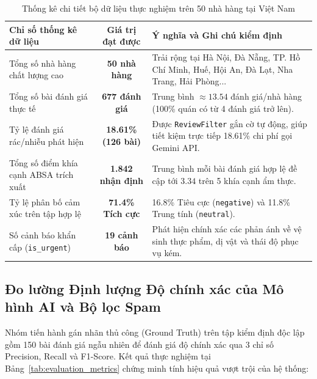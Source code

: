 \documentclass[12pt, a4paper]{article}
\begin{document}
\begin{table}[H]
\centering
\caption{Thống kê chi tiết bộ dữ liệu thực nghiệm trên 50 nhà hàng tại Việt Nam}
\label{tab:dataset_stats}
\vspace{0.15cm}
\footnotesize
\begin{tabularx}{\textwidth}{l c X}
\toprule
\rowcolor{blue!8}
\textbf{Chỉ số thống kê dữ liệu} & \textbf{Giá trị đạt được} & \textbf{Ý nghĩa và Ghi chú kiểm định} \\
\midrule
Tổng số nhà hàng chất lượng cao & \textbf{50 nhà hàng} & Trải rộng tại Hà Nội, Đà Nẵng, TP. Hồ Chí Minh, Huế, Hội An, Đà Lạt, Nha Trang, Hải Phòng... \\
\addlinespace
Tổng số bài đánh giá thực tế & \textbf{677 đánh giá} & Trung bình $\approx 13.54$ đánh giá/nhà hàng (100\% quán có từ 4 đánh giá trở lên). \\
\addlinespace
Tỷ lệ đánh giá rác/nhiễu phát hiện & \textbf{18.61\% (126 bài)} & Được \texttt{ReviewFilter} gắn cờ tự động, giúp tiết kiệm trực tiếp 18.61\% chi phí gọi Gemini API. \\
\addlinespace
Tổng số điểm khía cạnh ABSA trích xuất & \textbf{1.842 nhận định} & Trung bình mỗi bài đánh giá hợp lệ đề cập tới $3.34$ trên 5 khía cạnh ẩm thực. \\
\addlinespace
Tỷ lệ phân bố cảm xúc trên tập hợp lệ & \textbf{71.4\% Tích cực} & 16.8\% Tiêu cực (\texttt{negative}) và 11.8\% Trung tính (\texttt{neutral}). \\
\addlinespace
Số cảnh báo khẩn cấp (\texttt{is\_urgent}) & \textbf{19 cảnh báo} & Phát hiện chính xác các phản ánh về vệ sinh thực phẩm, dị vật và thái độ phục vụ kém. \\
\bottomrule
\end{tabularx}
\end{table}

\subsection{Đo lường Định lượng Độ chính xác của Mô hình AI và Bộ lọc Spam}
Nhóm tiến hành gán nhãn thủ công (Ground Truth) trên tập kiểm định độc lập gồm 150 bài đánh giá ngẫu nhiên để đánh giá độ chính xác qua 3 chỉ số Precision, Recall và F1-Score. Kết quả thực nghiệm tại Bảng~\ref{tab:evaluation_metrics} chứng minh tính hiệu quả vượt trội của hệ thống:
\end{document}
